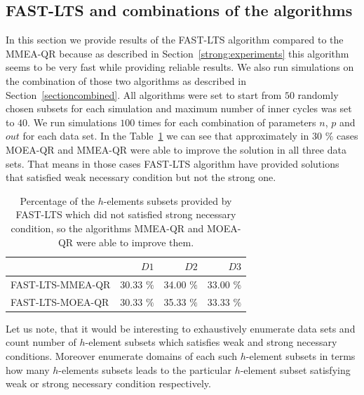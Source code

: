\subsection{FAST-LTS and combinations of the algorithms} \label{results:combinations}
In this section we provide results of the FAST-LTS algorithm compared to the MMEA-QR because as described in Section~\ref{strong:experiments} this algorithm seems to be very fast while providing reliable results. We also run simulations on the combination of those two algorithms as described in Section~\ref{sectioncombined}. All algorithms were set to start from $50$ randomly chosen subsets for each simulation and maximum number of inner cycles was set to $40$. We run simulations $100$ times for each combination of parameters $n$, $p$ and $out$ for each data set. In the Table~\ref{table:percentage:improvement} we can see that approximately in 30 $\%$ cases MOEA-QR and MMEA-QR were able to improve the solution in all three data sets. That means in those cases FAST-LTS algorithm have provided solutions that satisfied weak necessary condition but not the strong one.

\begin{table}[h!]
    \centering
    \begin{tabular}{l|r|r|r|}
        \hline\hline
         &    $D1$ &    $D2$ &    $D3$ \\
         \hline
         FAST-LTS-MMEA-QR &  30.33 $\%$ &  34.00 $\%$ &  33.00 $\%$ \\FAST-LTS-MOEA-QR &  30.33 $\%$ &  35.33 $\%$ &  33.33 $\%$  \\
         \hline
         
    \end{tabular}

    \caption{Percentage of the $h$-elements subsets provided by FAST-LTS which did not satisfied strong necessary condition, so the algorithms MMEA-QR and MOEA-QR were able to improve them.}
    \label{table:percentage:improvement}
\end{table}

Let us note, that it would be interesting to exhaustively enumerate data sets and count number of $h$-element subsets which satisfies weak and strong necessary conditions. Moreover enumerate domains of each such $h$-element subsets in terms how many $h$-elements subsets leads to the particular $h$-element subset satisfying weak or strong necessary condition respectively.



